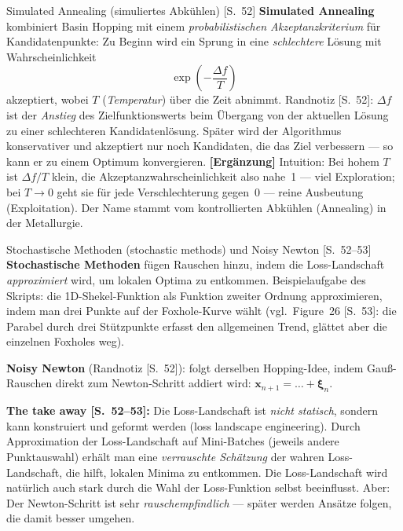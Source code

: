\begin{defbox}{Simulated Annealing (simuliertes Abkühlen) [S.~52]}
\textbf{Simulated Annealing} kombiniert Basin Hopping mit einem
\emph{probabilistischen Akzeptanzkriterium} für Kandidatenpunkte: Zu Beginn wird ein
Sprung in eine \emph{schlechtere} Lösung mit Wahrscheinlichkeit
\[
  \exp\!\left(-\frac{\Delta f}{T}\right)
\]
akzeptiert, wobei $T$ (\emph{Temperatur}) über die Zeit abnimmt. Randnotiz [S.~52]:
$\Delta f$ ist der \emph{Anstieg} des Zielfunktionswerts beim Übergang von der
aktuellen Lösung zu einer schlechteren Kandidatenlösung. Später wird der Algorithmus
konservativer und akzeptiert nur noch Kandidaten, die das Ziel verbessern --- so kann
er zu einem Optimum konvergieren. \textbf{[Ergänzung]} Intuition: Bei hohem $T$ ist
$\Delta f / T$ klein, die Akzeptanzwahrscheinlichkeit also nahe~1 --- viel Exploration;
bei $T \to 0$ geht sie für jede Verschlechterung gegen~0 --- reine Ausbeutung
(Exploitation). Der Name stammt vom kontrollierten Abkühlen (Annealing) in der
Metallurgie.
\end{defbox}

\begin{defbox}{Stochastische Methoden (stochastic methods) und Noisy Newton [S.~52--53]}
\textbf{Stochastische Methoden} fügen Rauschen hinzu, indem die Loss-Landschaft
\emph{approximiert} wird, um lokalen Optima zu entkommen. Beispielaufgabe des Skripts:
die 1D-Shekel-Funktion als Funktion zweiter Ordnung approximieren, indem man drei
Punkte auf der Foxhole-Kurve wählt (vgl.\ Figure~26 [S.~53]: die Parabel durch drei
Stützpunkte erfasst den allgemeinen Trend, glättet aber die einzelnen Foxholes weg).

\medskip
\textbf{Noisy Newton} (Randnotiz [S.~52]): folgt derselben Hopping-Idee, indem
Gau{\ss}-Rauschen direkt zum Newton-Schritt addiert wird:
$\mathbf{x}_{n+1} = \ldots + \boldsymbol{\xi}_n$.

\medskip
\textbf{The take away [S.~52--53]:} Die Loss-Landschaft ist \emph{nicht statisch},
sondern kann konstruiert und geformt werden (loss landscape engineering). Durch
Approximation der Loss-Landschaft auf Mini-Batches (jeweils andere Punktauswahl)
erhält man eine \emph{verrauschte Schätzung} der wahren Loss-Landschaft, die hilft,
lokalen Minima zu entkommen. Die Loss-Landschaft wird natürlich auch stark durch die
Wahl der Loss-Funktion selbst beeinflusst. Aber: Der Newton-Schritt ist sehr
\emph{rauschempfindlich} --- später werden Ansätze folgen, die damit besser umgehen.
\end{defbox}

